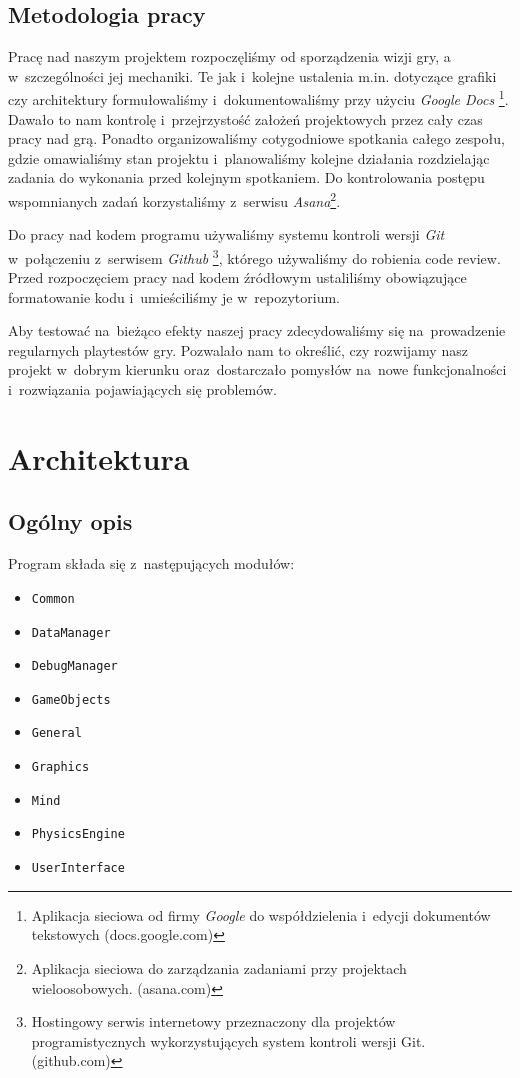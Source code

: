 \documentclass[licencjacka]{pracamgr}
\begin{document}
  \section{Metodologia pracy}
    Pracę nad naszym projektem rozpoczęliśmy od sporządzenia wizji gry, a w~szczególności jej mechaniki. Te jak i~kolejne
    ustalenia m.in. dotyczące grafiki czy architektury formułowaliśmy i~dokumentowaliśmy przy użyciu \emph{Google Docs}
    \footnote{Aplikacja sieciowa od firmy \emph{Google} do współdzielenia i~edycji dokumentów tekstowych
    (docs.google.com)}. Dawało to nam kontrolę i~przejrzystość założeń projektowych przez cały czas pracy nad grą.
    Ponadto organizowaliśmy cotygodniowe spotkania całego zespołu, gdzie omawialiśmy stan projektu i~planowaliśmy kolejne
    działania rozdzielając zadania do wykonania przed kolejnym spotkaniem. Do kontrolowania postępu wspomnianych zadań
    korzystaliśmy z~serwisu \emph{Asana}\footnote{Aplikacja sieciowa do zarządzania zadaniami przy projektach
    wieloosobowych. (asana.com)}.

    Do pracy nad kodem programu używaliśmy systemu kontroli wersji \emph{Git} w~połączeniu z~serwisem \emph{Github}
    \footnote{Hostingowy serwis internetowy przeznaczony dla projektów programistycznych wykorzystujących system kontroli
    wersji Git. (github.com)}, którego używaliśmy do robienia code review. Przed rozpoczęciem pracy nad kodem źródłowym
    ustaliliśmy obowiązujące formatowanie kodu i~umieściliśmy je w~repozytorium.

    Aby testować na~bieżąco efekty naszej pracy zdecydowaliśmy się na~prowadzenie regularnych playtestów gry. Pozwalało
    nam to określić, czy rozwijamy nasz projekt w~dobrym kierunku oraz~dostarczało pomysłów na~nowe funkcjonalności
    i~rozwiązania pojawiających się problemów.

\chapter{Architektura}
  \section{Ogólny opis}
    Program składa się z~następujących modułów:
    \begin{itemize}
      \item \texttt{Common}
      \item \texttt{DataManager}
      \item \texttt{DebugManager}
      \item \texttt{GameObjects}
      \item \texttt{General}
      \item \texttt{Graphics}
      \item \texttt{Mind}
      \item \texttt{PhysicsEngine}
      \item \texttt{UserInterface}
    \end{itemize}
\end{document}
